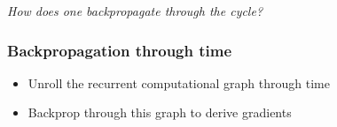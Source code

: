 \documentclass{beamer}
\begin{document}
\begin{frame}
    \vspace{0.5cm}

    \centering
    \it How does one backpropagate through the cycle?


\end{frame}

\begin{frame}
    \frametitle{Backpropagation through time}

    \begin{itemize}
        \item Unroll the recurrent computational graph through time
        \item Backprop through this graph to derive gradients
    \end{itemize}

    \vspace{0.5cm}


\end{frame}
\end{document}

